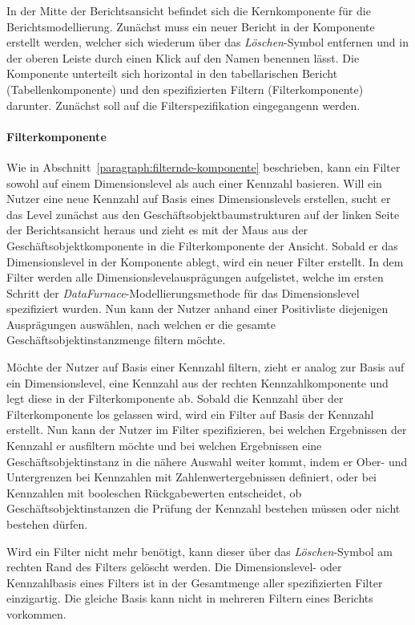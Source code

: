 \documentclass[
  language=german, %
  type=bachelor,%
  ngerman
]{isthesis}
\begin{document}
\begin{content}
  In der Mitte der Berichtsansicht befindet sich die Kernkomponente für die
  Berichtsmodellierung. Zunächst muss ein neuer Bericht
  in der Komponente erstellt werden, welcher sich wiederum über das
  \textit{Löschen}-Symbol entfernen und in der oberen Leiste durch einen Klick
  auf den Namen benennen lässt. Die Komponente unterteilt sich horizontal in
  den tabellarischen Bericht (Tabellenkomponente) und den spezifizierten
  Filtern (Filterkomponente) darunter. Zunächst soll auf die
  Filterspezifikation eingegangenn werden. 
  
  \paragraph{Filterkomponente}
  
  Wie in Abschnitt~\ref{paragraph:filternde-komponente}
  beschrieben, kann ein Filter sowohl auf einem Dimensionslevel als auch einer
  Kennzahl basieren. Will ein Nutzer eine neue Kennzahl auf Basis eines
  Dimensionslevels erstellen, sucht er das Level zunächst aus den
  Geschäftsobjektbaumstrukturen auf der linken Seite der Berichtsansicht heraus
  und zieht es mit der Maus aus der Geschäftsobjektkomponente in die
  Filterkomponente der Ansicht. Sobald er das Dimensionslevel in der Komponente
  ablegt, wird ein neuer Filter erstellt. In dem Filter werden alle
  Dimensionslevelausprägungen aufgelistet, welche im ersten Schritt der
  \textit{DataFurnace}-Modellierungsmethode für das Dimensionslevel
  spezifiziert wurden. Nun kann der Nutzer anhand einer Positivliste
  diejenigen Ausprägungen auswählen, nach welchen er die gesamte
  Geschäftsobjektinstanzmenge filtern möchte.

  Möchte der Nutzer auf Basis einer Kennzahl filtern, zieht er analog zur
  Basis auf ein Dimensionslevel, eine Kennzahl aus der rechten
  Kennzahlkomponente und legt diese in der Filterkomponente ab. Sobald die
  Kennzahl über der Filterkomponente los gelassen wird, wird ein Filter auf
  Basis der Kennzahl erstellt. Nun kann der Nutzer im Filter spezifizieren, bei
  welchen Ergebnissen der Kennzahl er ausfiltern möchte und bei welchen
  Ergebnissen eine Geschäftsobjektinstanz in die nähere Auswahl weiter kommt,
  indem er \zB{} Ober- und Untergrenzen bei Kennzahlen mit
  Zahlenwertergebnissen definiert, oder bei Kennzahlen mit booleschen
  Rückgabewerten entscheidet, ob Geschäftsobjektinstanzen die Prüfung der
  Kennzahl bestehen müssen oder nicht bestehen dürfen.

  Wird ein Filter nicht mehr benötigt, kann dieser über das
  \textit{Löschen}-Symbol am rechten Rand des Filters gelöscht werden. Die
  Dimensionslevel- oder Kennzahlbasis eines Filters ist in der Gesamtmenge
  aller spezifizierten Filter einzigartig. Die gleiche Basis kann nicht in
  mehreren Filtern eines Berichts vorkommen.


\end{content}
\end{document}
